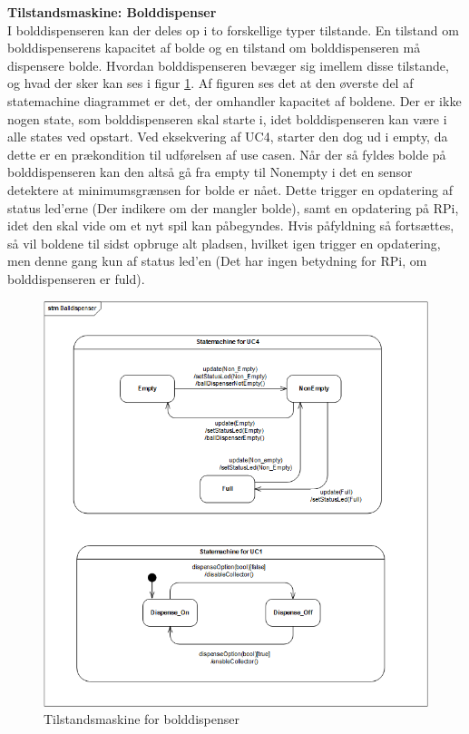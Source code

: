 \documentclass[Arkitektur/System_main.tex]{subfiles}
\begin{document}
\textbf{Tilstandsmaskine: Bolddispenser}\label{sec:BallDispSTM}\\
I bolddispenseren kan der deles op i to forskellige typer tilstande. En tilstand om bolddispenserens kapacitet af bolde og en tilstand om bolddispenseren må dispensere bolde. Hvordan bolddispenseren bevæger sig imellem disse tilstande, og hvad der sker kan ses i figur \ref{fig:stm_balldispenser}. 
Af figuren ses det at den øverste del af statemachine diagrammet er det, der omhandler kapacitet af boldene. Der er ikke nogen state, som bolddispenseren skal starte i, idet bolddispenseren kan være i alle states ved opstart. Ved eksekvering af UC4, starter den dog ud i empty, da dette er en prækondition til udførelsen af use casen. 
Når der så fyldes bolde på bolddispenseren kan den altså gå fra empty til Nonempty i det en sensor detektere at minimumsgrænsen for bolde er nået. Dette trigger en opdatering af status led'erne (Der indikere om der mangler bolde), samt en opdatering på RPi, idet den skal vide om et nyt spil kan påbegyndes. 
Hvis påfyldning så fortsættes, så vil boldene til sidst opbruge alt pladsen, hvilket igen trigger en opdatering, men denne gang kun af status led'en (Det har ingen betydning for RPi, om bolddispenseren er fuld).
\begin{figure}[H]
    \centering
    \includegraphics[width=\textwidth]{Arkitektur/Softwarearkitektur/Applikationsmodel/BallDispenser/graphicsBallDispenser/ApplikationsmodelBolddispenserstm.PNG}
    \caption{Tilstandsmaskine for bolddispenser}
    \label{fig:stm_balldispenser}
\end{figure}
\newpage
\end{document}
